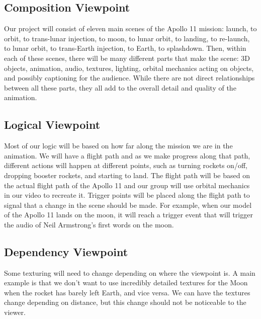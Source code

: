 \documentclass[onecolumn, draftclsnofoot,10pt, compsoc]{IEEEtran}
\begin{document}
    \subsection{Composition Viewpoint}
    
    Our project will consist of eleven main scenes of the Apollo 11 mission: launch, to orbit, to trans-lunar injection, to moon, to lunar orbit, to landing, to re-launch, to lunar orbit, to trans-Earth injection, to Earth, to splashdown. Then, within each of these scenes, there will be many different parts that make the scene: 3D objects, animation, audio, textures, lighting, orbital mechanics acting on objects, and possibly captioning for the audience. While there are not direct relationships between all these parts, they all add to the overall detail and quality of the animation. 
    
    \subsection{Logical Viewpoint}

    Most of our logic will be based on how far along the mission we are in the animation. We will have a flight path and as we make progress along that path, different actions will happen at different points, such as turning rockets on/off, dropping booster rockets, and starting to land. The flight path will be based on the actual flight path of the Apollo 11 and our group will use orbital mechanics in our video to recreate it. Trigger points will be placed along the flight path to signal that a change in the scene should be made. For example, when our model of the Apollo 11 lands on the moon, it will reach a trigger event that will trigger the audio of Neil Armstrong's first words on the moon. 
    
    \subsection{Dependency Viewpoint}

    Some texturing will need to change depending on where the viewpoint is. A main example is that we don't want to use incredibly detailed textures for the Moon when the rocket has barely left Earth, and vice versa. We can have the textures change depending on distance, but this change should not be noticeable to the viewer.
    
\end{document}
